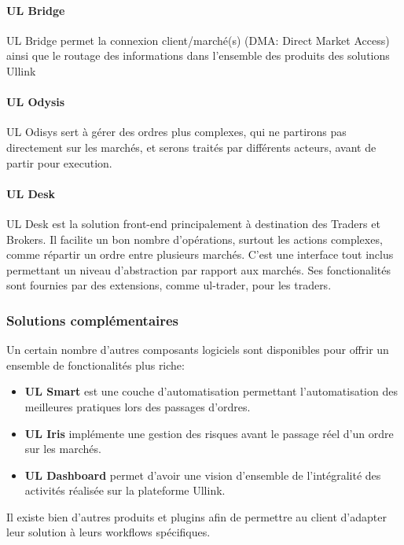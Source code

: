 \documentclass[a4paper, 12pt]{article}
\begin{document}
\paragraph{UL Bridge}

UL Bridge permet la connexion client/marché(s) (DMA: Direct Market Access) ainsi que le routage des informations dans l'ensemble des produits des solutions Ullink

\paragraph{UL Odysis}

UL Odisys sert à gérer des ordres plus complexes, qui ne partirons pas directement sur les marchés, et serons traités par différents acteurs, avant de partir pour execution.

\paragraph{UL Desk}
UL Desk est la solution front-end principalement à destination des Traders et Brokers. Il facilite un bon nombre d'opérations, surtout les actions complexes, comme répartir un ordre entre plusieurs marchés. C'est une interface tout inclus permettant un niveau d'abstraction par rapport aux marchés. Ses fonctionalités sont fournies par des extensions, comme ul-trader, pour les traders.

\subsubsection{Solutions complémentaires}
Un certain nombre d'autres composants logiciels sont disponibles pour offrir un ensemble de fonctionalités plus riche:

\begin{itemize}
\item{{\bf UL Smart} est une couche d'automatisation permettant l'automatisation des meilleures pratiques lors des passages d'ordres.}
\item{{\bf UL Iris} implémente une gestion des risques avant le passage réel d'un ordre sur les marchés.}
\item{{\bf UL Dashboard} permet d'avoir une vision d'ensemble de l'intégralité des activités réalisée sur la plateforme Ullink.}
\end{itemize}

Il existe bien d'autres produits et plugins afin de permettre au client d'adapter leur solution à leurs workflows spécifiques.
\end{document}
